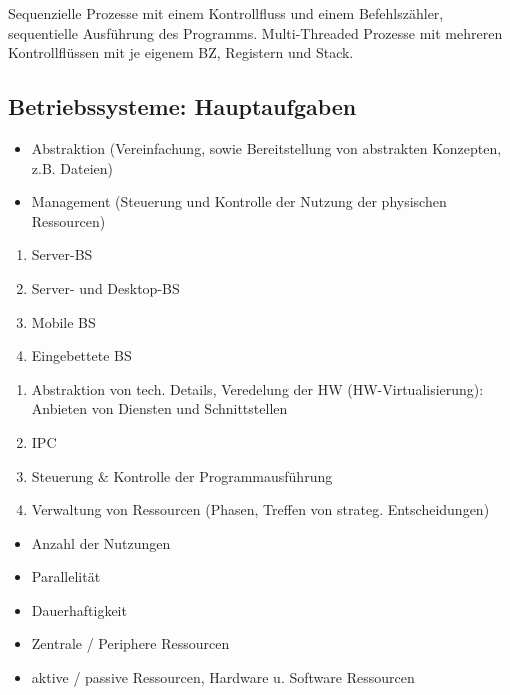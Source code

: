 Sequenzielle Prozesse mit einem Kontrollfluss und einem Befehlszähler, sequentielle Ausführung des Programms. Multi-Threaded Prozesse mit mehreren Kontrollflüssen mit je eigenem BZ, Registern und Stack.

\subsection{Betriebssysteme: Hauptaufgaben}
\begin{itemize} \setlength\itemsep{0em}
	\item Abstraktion (Vereinfachung, sowie Bereitstellung von abstrakten Konzepten, z.B. Dateien)
	\item Management (Steuerung und Kontrolle der Nutzung der physischen Ressourcen)
\end{itemize}

\begin{enumerate} \setlength\itemsep{0em}
	\item Server-BS
	\item Server- und Desktop-BS
	\item Mobile BS
	\item Eingebettete BS
\end{enumerate}

\begin{enumerate} \setlength\itemsep{0em}
	\item Abstraktion von tech. Details, Veredelung der HW (HW-Virtualisierung): Anbieten von Diensten und Schnittstellen
	\item IPC
	\item Steuerung \& Kontrolle der Programmausführung
	\item Verwaltung von Ressourcen (Phasen, Treffen von strateg. Entscheidungen)
\end{enumerate}

\begin{itemize} \setlength\itemsep{0em}
	\item Anzahl der Nutzungen
	\item Parallelität
	\item Dauerhaftigkeit
	\item Zentrale / Periphere Ressourcen
	\item aktive / passive Ressourcen, Hardware u. Software Ressourcen
\end{itemize}

